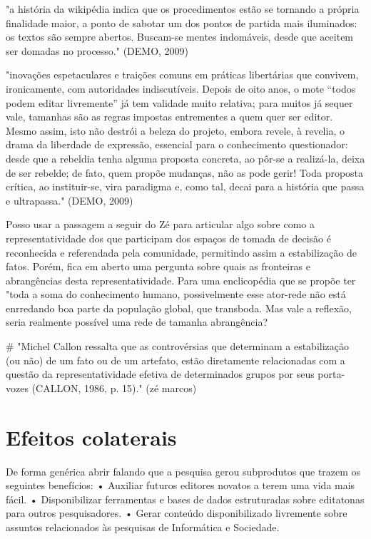 "a história da wikipédia indica que os procedimentos estão se tornando a própria finalidade maior, a ponto de sabotar um dos pontos de partida mais iluminados: os textos são sempre abertos. Buscam-se mentes indomáveis, desde que aceitem ser domadas no processo." (DEMO, 2009)

"inovações espetaculares e traições comuns em práticas libertárias que convivem, ironicamente, com autoridades indiscutíveis. Depois de oito anos, o mote “todos podem editar livremente” já tem validade muito relativa; para muitos já sequer vale, tamanhas são as regras impostas entrementes a quem quer ser editor. Mesmo assim, isto não destrói a beleza do projeto, embora revele, à revelia, o drama da liberdade de expressão, essencial para o conhecimento questionador: desde que a rebeldia tenha alguma proposta concreta, ao pôr-se a realizá-la, deixa de ser rebelde; de fato, quem propõe mudanças, não as pode gerir! Toda proposta crítica, ao instituir-se, vira paradigma e, como tal, decai para a história que passa e ultrapassa." (DEMO, 2009)

Posso usar a passagem a seguir do Zé para articular algo sobre como a representatividade dos que participam dos espaços de tomada de decisão é reconhecida e referendada pela comunidade, permitindo assim a estabilização de fatos. Porém, fica em aberto uma pergunta sobre quais as fronteiras e abrangências desta representatividade. Para uma enclicopédia que se propõe ter "toda a soma do conhecimento humano, possivelmente esse ator-rede não está enrredando boa parte da população global, que transboda. Mas vale a reflexão, seria realmente possível uma rede de tamanha abrangência?

# "Michel Callon ressalta que as controvérsias que determinam a estabilização (ou não) de um fato ou de um artefato, estão diretamente relacionadas com a questão da representatividade efetiva de determinados grupos por seus porta-vozes (CALLON, 1986, p. 15)." (zé marcos)

\section{Efeitos colaterais}

De forma genérica abrir falando que a pesquisa gerou subprodutos que trazem os seguintes benefícios:
    • Auxiliar futuros editores novatos a terem uma vida mais fácil.
    • Disponibilizar ferramentas e bases de dados estruturadas sobre editatonas para outros pesquisadores.
    • Gerar conteúdo disponibilizado livremente sobre assuntos relacionados às pesquisas de Informática e Sociedade.
    
